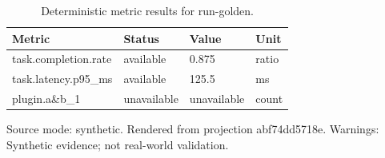 {
\begin{table}[htbp]
\centering
\caption{Deterministic metric results for run-golden.}
\label{tab:traffictwin-metrics-abf74dd5718e}
\small
\renewcommand{\arraystretch}{1.15}
\begin{tabular}{llll}
\hline
Metric & Status & Value & Unit \\
\hline
task.completion.rate & available & 0.875 & ratio \\
task.latency.p95\_ms & available & 125.5 & ms \\
plugin.a\&b\_1 & unavailable & unavailable & count \\
\hline
\end{tabular}
\par\footnotesize
Source mode: synthetic.
Rendered from projection abf74dd5718e.
 Warnings: Synthetic evidence; not real-world validation.
\end{table}
}
